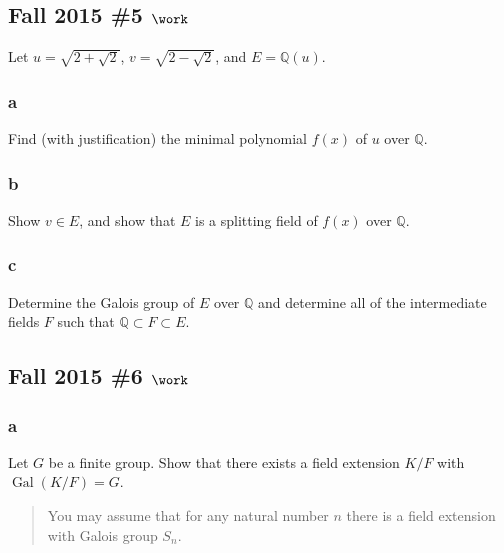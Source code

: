 \hypertarget{fall-2015-5-work}{%
\subsection{\texorpdfstring{Fall 2015 \#5
\(\work\)}{Fall 2015 \#5 \textbackslash work}}\label{fall-2015-5-work}}

Let \(u = \sqrt{2 + \sqrt{2}}\), \(v = \sqrt{2 - \sqrt{2}}\), and
\(E = {\mathbb{Q}}(u)\).

\hypertarget{a-70}{%
\subsubsection{a}\label{a-70}}

Find (with justification) the minimal polynomial \(f(x)\) of \(u\) over
\({\mathbb{Q}}\).

\hypertarget{b-60}{%
\subsubsection{b}\label{b-60}}

Show \(v\in E\), and show that \(E\) is a splitting field of \(f(x)\)
over \({\mathbb{Q}}\).

\hypertarget{c-41}{%
\subsubsection{c}\label{c-41}}

Determine the Galois group of \(E\) over \({\mathbb{Q}}\) and determine
all of the intermediate fields \(F\) such that
\({\mathbb{Q}}\subset F \subset E\).

\hypertarget{fall-2015-6-work}{%
\subsection{\texorpdfstring{Fall 2015 \#6
\(\work\)}{Fall 2015 \#6 \textbackslash work}}\label{fall-2015-6-work}}

\hypertarget{a-71}{%
\subsubsection{a}\label{a-71}}

Let \(G\) be a finite group. Show that there exists a field extension
\(K/F\) with \(\operatorname{Gal}(K/F) = G\).

\begin{quote}
You may assume that for any natural number \(n\) there is a field
extension with Galois group \(S_n\).
\end{quote}

